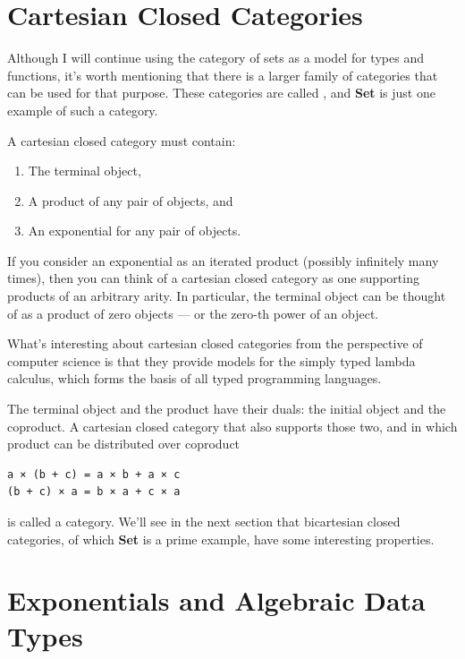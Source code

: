 \section{Cartesian Closed
Categories}\label{cartesian-closed-categories}

Although I will continue using the category of sets as a model for types
and functions, it's worth mentioning that there is a larger family of
categories that can be used for that purpose. These categories are
called , and \textbf{Set} is just one example of
such a category.

A cartesian closed category must contain:

\begin{enumerate}
\tightlist
\item
  The terminal object,
\item
  A product of any pair of objects, and
\item
  An exponential for any pair of objects.
\end{enumerate}

If you consider an exponential as an iterated product (possibly
infinitely many times), then you can think of a cartesian closed
category as one supporting products of an arbitrary arity. In
particular, the terminal object can be thought of as a product of zero
objects --- or the zero-th power of an object.

What's interesting about cartesian closed categories from the
perspective of computer science is that they provide models for the
simply typed lambda calculus, which forms the basis of all typed
programming languages.

The terminal object and the product have their duals: the initial object
and the coproduct. A cartesian closed category that also supports those
two, and in which product can be distributed over coproduct

\begin{verbatim}
a × (b + c) = a × b + a × c
(b + c) × a = b × a + c × a
\end{verbatim}

is called a  category. We'll see in the next
section that bicartesian closed categories, of which \textbf{Set} is a
prime example, have some interesting properties.

\section{Exponentials and Algebraic Data
Types}\label{exponentials-and-algebraic-data-types}

